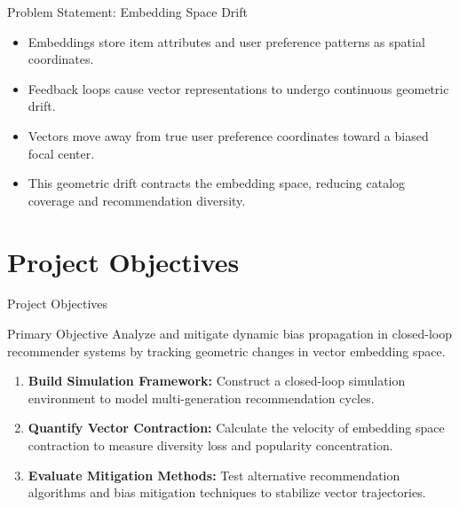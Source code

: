 \documentclass[11pt,aspectratio=43]{beamer}
\newcommand{\strong}[1]{\textbf{#1}}
\begin{document}
\begin{frame}{Problem Statement: Embedding Space Drift}
  \begin{itemize}
    \item Embeddings store item attributes and user preference patterns as spatial coordinates.
    
    \item Feedback loops cause vector representations to undergo continuous geometric drift.
    
    \item Vectors move away from true user preference coordinates toward a biased focal center.
    
    \item This geometric drift contracts the embedding space, reducing catalog coverage and recommendation diversity.
  \end{itemize}
\end{frame}

\section{Project Objectives}
\begin{frame}{Project Objectives}
  \begin{block}{Primary Objective}
    Analyze and mitigate dynamic bias propagation in closed-loop recommender systems by tracking geometric changes in vector embedding space.
  \end{block}
  
  \vspace{0.3cm}
  
  \begin{enumerate}
    \item \strong{Build Simulation Framework:} Construct a closed-loop simulation environment to model multi-generation recommendation cycles.
    
    \item \strong{Quantify Vector Contraction:} Calculate the velocity of embedding space contraction to measure diversity loss and popularity concentration.
    
    \item \strong{Evaluate Mitigation Methods:} Test alternative recommendation algorithms and bias mitigation techniques to stabilize vector trajectories.
  \end{enumerate}
\end{frame}
\end{document}
